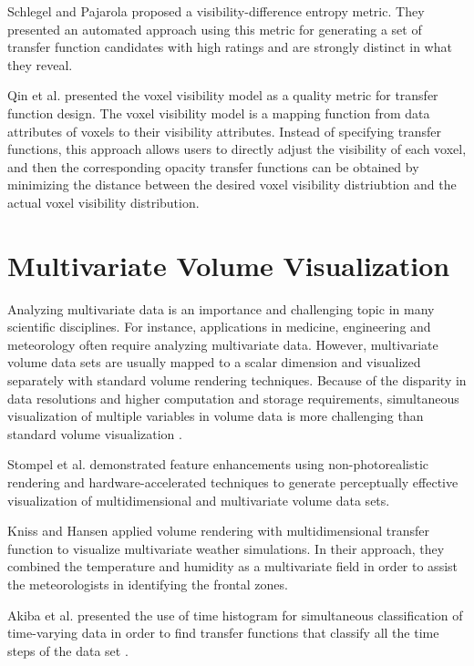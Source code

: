 Schlegel and Pajarola \cite{schlegel_visibility-difference_2013} proposed a visibility-difference entropy metric. They presented an automated approach using this metric for generating a set of transfer function candidates with high ratings and are strongly distinct in what they reveal.

Qin et al. \cite{qin_voxel_2015} presented the voxel visibility model as a quality metric for transfer function design.
The voxel visibility model is a mapping function from data attributes of voxels to their visibility attributes. Instead of specifying transfer functions, this approach allows users to directly adjust the visibility of each voxel, and then the corresponding opacity transfer functions can be obtained by minimizing the distance between the desired voxel visibility distriubtion and the actual voxel visibility distribution.

\section{Multivariate Volume Visualization}
Analyzing multivariate data is an importance and challenging topic in many scientific disciplines. For instance, applications in medicine, engineering and meteorology often require analyzing multivariate data.
However, multivariate volume data sets are usually mapped to a scalar dimension and visualized separately with standard volume rendering techniques. Because of the disparity in data resolutions and higher computation and storage requirements, simultaneous visualization of multiple variables in volume data is more challenging than standard volume visualization \cite{wilson_interactive_2002}.


Stompel et al. \cite{stompel_visualization_2002} demonstrated feature enhancements using non-photorealistic rendering and hardware-accelerated techniques to generate perceptually effective visualization of multidimensional and multivariate volume data sets.

Kniss and Hansen \cite{kniss_volume_2002} applied volume rendering with multidimensional transfer function to visualize multivariate weather simulations. In their approach, they combined the temperature and humidity as a multivariate field in order to assist the meteorologists in identifying the frontal zones. 

Akiba et al. presented the use of time histogram for simultaneous classification of time-varying data in order to find transfer functions that classify all the time steps of the data set \cite{akiba_simultaneous_2006}.

